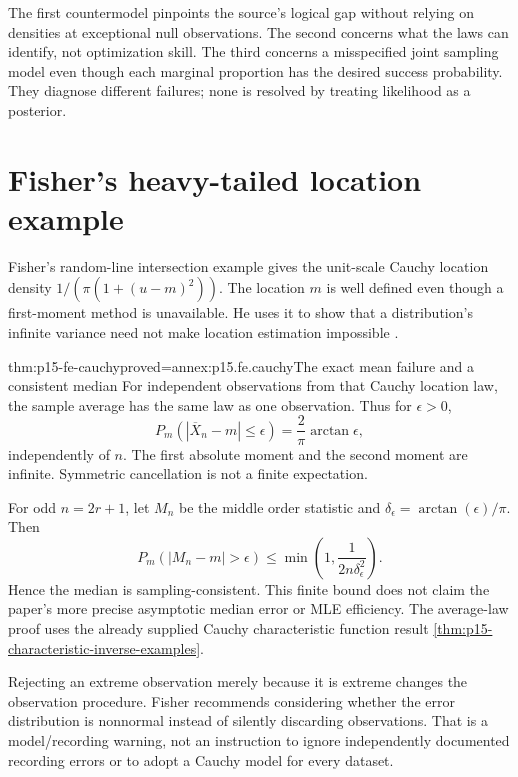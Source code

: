 The first countermodel pinpoints the source's logical gap without relying
on densities at exceptional null observations. The second concerns what
the laws can identify, not optimization skill. The third concerns a
misspecified joint sampling model even though each marginal proportion
has the desired success probability. They diagnose different failures;
none is resolved by treating likelihood as a posterior.

\section{Fisher's heavy-tailed location example}

Fisher's random-line intersection example gives the unit-scale Cauchy
location density \(1/(\pi(1+(u-m)^2))\). The location \(m\) is
well defined even though a first-moment method is unavailable. He uses it
to show that a distribution's infinite variance need not make location
estimation impossible \cite[pp.~321--323]{Fisher1922Foundations}.

\begin{hbtheorem}{thm:p15-fe-cauchy}{proved=annex:p15.fe.cauchy}{The exact mean failure and a consistent median}
For independent observations from that Cauchy location law, the sample
average has the same law as one observation. Thus for \(\epsilon>0\),
\[
 P_m(|\overline X_n-m|\leq\epsilon)
                       =\frac2\pi\arctan\epsilon,
\]
independently of \(n\). The first absolute moment and the second
moment are infinite. Symmetric cancellation is not a finite expectation.

For odd \(n=2r+1\), let \(M_n\) be the middle order statistic and
\(\delta_\epsilon=\arctan(\epsilon)/\pi\). Then
\[
 P_m(|M_n-m|>\epsilon)
       \leq\min\!\left(1,\frac1{2n\delta_\epsilon^2}\right).
\]
Hence the median is sampling-consistent. This finite bound does not
claim the paper's more precise asymptotic median error or MLE efficiency.
The average-law proof uses the already supplied Cauchy characteristic
function result \cref{thm:p15-characteristic-inverse-examples}.
\end{hbtheorem}

Rejecting an extreme observation merely because it is extreme changes
the observation procedure. Fisher recommends considering whether the
error distribution is nonnormal instead of silently discarding observations.
That is a model/recording warning, not an instruction to ignore independently
documented recording errors or to adopt a Cauchy model for every dataset.

